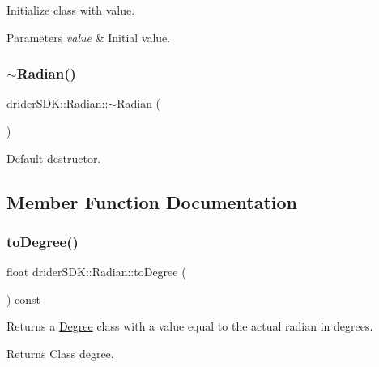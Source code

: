 Initialize class with value.


\begin{DoxyParams}{Parameters}
{\em value} & Initial value. \\
\hline
\end{DoxyParams}
\mbox{\label{classdrider_s_d_k_1_1_radian_a9b1711276eed04187623b4cb047c90ce}} 
\subsubsection{\texorpdfstring{$\sim$\+Radian()}{~Radian()}}
{\footnotesize\ttfamily drider\+S\+D\+K\+::\+Radian\+::$\sim$\+Radian (\begin{DoxyParamCaption}{ }\end{DoxyParamCaption})}

Default destructor. 

\subsection{Member Function Documentation}
\mbox{\label{classdrider_s_d_k_1_1_radian_a2b848dd9f60fbdb8e113620e9933f3d8}} 
\subsubsection{\texorpdfstring{to\+Degree()}{toDegree()}}
{\footnotesize\ttfamily float drider\+S\+D\+K\+::\+Radian\+::to\+Degree (\begin{DoxyParamCaption}{ }\end{DoxyParamCaption}) const}

Returns a \hyperlink{classdrider_s_d_k_1_1_degree}{Degree} class with a value equal to the actual radian in degrees.

\begin{DoxyReturn}{Returns}
Class degree. 
\end{DoxyReturn}
\mbox{\label{classdrider_s_d_k_1_1_radian_ac9d138249e554f129d2ffc0ddb39b881}} 
